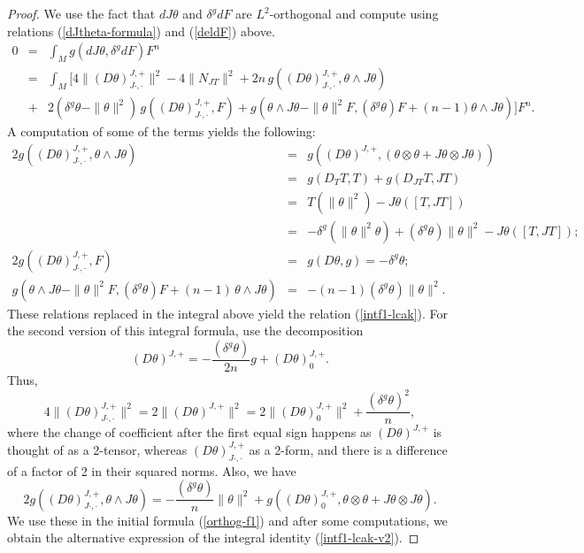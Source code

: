 \documentclass[a4paper,11pt]{amsart}
\theoremstyle{definition}
\renewcommand{\[}{\begin{equation*}}
\renewcommand{\]}{\end{equation*}}
\begin{document}
\begin{proof}
    We use the fact that $dJ\theta$ and $\delta^g dF$ are $L^2$-orthogonal and compute using relations (\ref{dJtheta-formula}) and (\ref{deldF}) above.
\begin{eqnarray} \label{orthog-f1}
0 &= &\int_M g(dJ \theta, \delta^g dF) F^n  \\ \nonumber
&= &\int_M \Big[4 \|(D \theta)^{J,+}_{J\cdot,\cdot}\|^2 - 4\|N_{JT}\|^2 +2n\,g\left( (D \theta)^{J,+}_{J\cdot,\cdot}, \theta \wedge J\theta\right)  \\ \nonumber
&+& 2 (\delta^g \theta - \|\theta\|^2)\, g\left( (D \theta)^{J,+}_{J\cdot,\cdot}, F\right) + g \left( \theta \wedge J\theta - \|\theta\|^2 F  ,  (\delta^g \theta) F + (n-1) \theta \wedge J\theta \right)  \Big] F^n.
\end{eqnarray}   
A computation of some of the terms yields the following:
\begin{eqnarray*}
2 g\left( (D \theta)^{J,+}_{J\cdot,\cdot}, \theta \wedge J\theta\right) &=& g \left( (D \theta)^{J,+}, (\theta \otimes \theta + J\theta \otimes J\theta ) \right) \\ &=& g\left(D_T T, T\right)+ g\left(D_{JT}T,JT\right)\\
&=& T(\|\theta\|^2) - J\theta([T,JT])  \\
&=&- \delta^g(\|\theta\|^2 \theta) + (\delta^g \theta)\|\theta \|^2 - J\theta([T,JT]) ;  \\
2g\left( (D \theta)^{J,+}_{J\cdot,\cdot}, F\right) &=& g\left(D\theta, g\right) = - \delta^g \theta  ;\\
g\left(\theta \wedge J\theta - \|\theta\|^2 F  ,  (\delta^g \theta) F + (n-1)\, \theta \wedge J\theta \right) &=& - (n-1) (\delta^g \theta) \|\theta\|^2.
\end{eqnarray*}
These relations replaced in the integral above yield the relation (\ref{intf1-lcak}). For the second version of this integral formula, 
use the decomposition 
$$ (D \theta)^{J,+} = -\frac{(\delta^g \theta)}{2n} g + (D \theta)^{J,+}_0. $$
Thus,
$$ 4 \|(D\theta)^{J,+}_{J\cdot,\cdot}\|^2 = 2\|(D\theta)^{J,+}\|^2 = 2 \|(D\theta)_0^{J,+}\|^2 + \frac{ (\delta^g \theta)^2}{n},$$
where the change of coefficient after the first equal sign happens as
$(D\theta)^{J,+}$ is thought of as a 2-tensor, whereas $(D\theta)^{J,+}_{J\cdot,\cdot}$ as a 2-form, and there is a difference of a factor of 2 in their squared norms.
Also, we have 
$$   2 g\left( (D \theta)^{J,+}_{J\cdot,\cdot}, \theta \wedge J\theta\right)
= -\frac{(\delta^g \theta)}{n}\|\theta\|^2 +  g\left( (D \theta)^{J,+}_0, \theta \otimes \theta + J\theta \otimes J\theta\right). $$
We use these in the initial formula (\ref{orthog-f1}) and after some computations, we obtain the alternative expression of the integral identity 
(\ref{intf1-lcak-v2}).
\end{proof}
\end{document}
